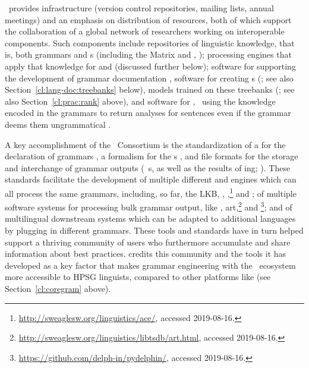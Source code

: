 \documentclass[output=paper
 	        ,biblatex
                ,babelshorthands
                ,newtxmath
                ,draftmode
                ,colorlinks, citecolor=brown
]{langscibook}
\begin{document}
\delphin\ provides infrastructure (version control repositories, mailing lists, annual meetings) and
an emphasis on  distribution of resources, both of which support the collaboration
of a global network of researchers working on interoperable components. Such components include
repositories of linguistic knowledge, that is, both grammars and s (including the
Matrix and , \citealt{Fokkens:14}); processing engines that apply that knowledge for
 and  (discussed further below); software for supporting the
development of grammar documentation
\citep[e.g.,][]{Hashimoto-etal:07}, software for creating s
(\citealt{OFTM2004a-u,Packard:15}; see also Section~\ref{cl:lang-doc:treebanks} below),  models trained on these treebanks (\citealt{Tou:Man:Fli:Oep:05}; see also
Section~\ref{cl:prac:rank} above), and software for , \ie\ using the
knowledge encoded in the grammars to return analyses for sentences even if the grammar deems them
ungrammatical \citep{W11-2923,buys2017parse,chen2018parse}.

A key accomplishment of the \delphin\ Consortium is the standardization of a  for the
declaration of grammars \citep{Copestake:02:CLE}, a formalism for the s
\citep{CFPS2005a}, and file formats for the storage and interchange of
grammar outputs (\eg\ s, as well as the results of ing;
\citealt{Oepen:01,OFTM2004a-u}).  These standards facilitate the development of multiple different
 and  engines which can all process the same grammars, including, so
far, the LKB\indexlkb \citep{Copestake2002a},  \citep{callmeier00},
,\footnote{\url{http://sweaglesw.org/linguistics/ace/}, accessed 2019-08-16.}  and
 \citep{Slayden2012a-u}; of multiple software systems for processing bulk grammar output,
like \itsdb \citep{Oepen:01}, art,\footnote{\url{http://sweaglesw.org/linguistics/libtsdb/art.html}, accessed
  2019-08-16.} and \footnote{\url{https://github.com/delph-in/pydelphin/}, accessed
  2019-08-16.};
and of multilingual downstream systems which can be adapted to additional languages by plugging in
different grammars.  These tools and standards have in turn helped support a thriving community of
users who furthermore accumulate and share information about best practices.
\citet[234]{MelnikHandWritten} credits this community and the tools it has developed as a key factor
that makes grammar engineering with the \delphin\ ecosystem more accessible to HPSG linguists,
compared to other platforms like  (see Section~\ref{cl:coregram} above).
\end{document}
